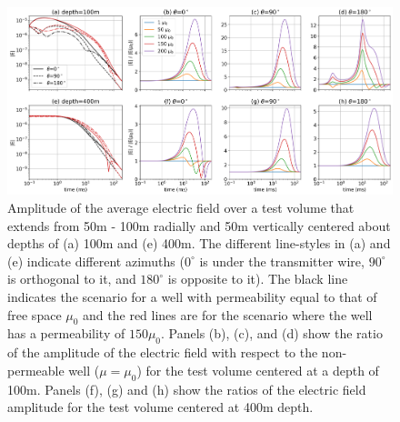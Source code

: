 \begin{figure}
    \begin{center}
    \includegraphics[width=\textwidth]{figures/excitation-time.png}
    \end{center}
\caption{
    Amplitude of the average electric field over a test volume that extends from 50m - 100m radially and 50m vertically centered about depths of (a) 100m and (e) 400m. The different line-styles in (a) and (e) indicate different azimuths ($0^\circ$ is under the transmitter wire, $90^\circ$ is orthogonal to it, and $180^\circ$ is opposite to it). The black line indicates the scenario for a well with permeability equal to that of free space $\mu_0$ and the red lines are for the scenario where the well has a permeability of $150\mu_0$. Panels (b), (c), and (d) show the ratio of the amplitude of the electric field with respect to the non-permeable well ($\mu=\mu_0$) for the test volume centered at a depth of 100m. Panels (f), (g) and (h) show the ratios of the electric field amplitude for the test volume centered at 400m depth.
}
\label{fig:excitation-time}
\end{figure}




